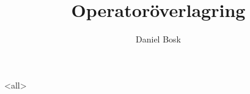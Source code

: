 \documentclass[ignoreframetext]{beamer}
\begin{document}
\title{%
  Operatoröverlagring
}
\author{Daniel Bosk}

\begin{frame}
  \maketitle
\end{frame}

\mode<all>

\mode*

\begin{frame}[allowframebreaks]
  \printbibliography
\end{frame}
\end{document}
